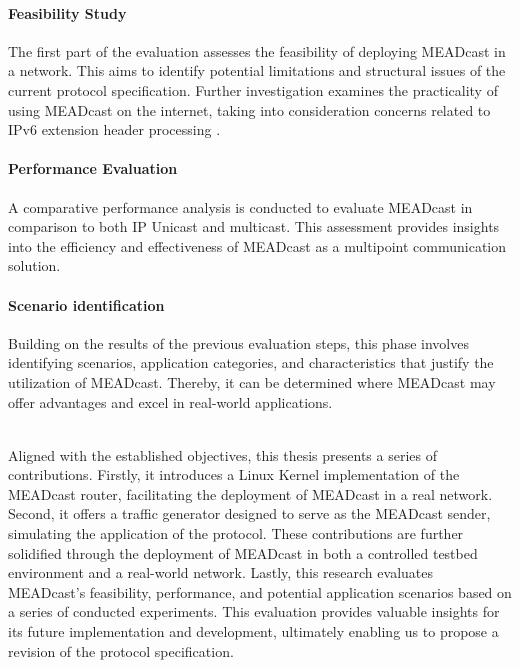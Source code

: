 \paragraph{Feasibility Study} %
\label{par:Feasibility Study}
The first part of the evaluation assesses the feasibility of deploying
    MEADcast in a network.
This aims to identify potential limitations and structural issues of the
    current protocol specification.
Further investigation examines the practicality of using MEADcast on the
    internet, taking into consideration concerns related to IPv6 extension
    header processing \cite{rfc7872_ext_hdrs_drop_rate}.

\paragraph{Performance Evaluation} %
\label{par:Performance Evaluation}
A comparative performance analysis is conducted to evaluate MEADcast in
    comparison to both IP Unicast and multicast.
This assessment provides insights into the efficiency and effectiveness of
    MEADcast as a multipoint communication solution.

\paragraph{Scenario identification} %
\label{par:Scenario identification}
Building on the results of the previous evaluation steps, this phase involves
    identifying scenarios, application categories, and characteristics that
    justify the utilization of MEADcast.
Thereby, it can be determined where MEADcast may offer advantages and excel in
    real-world applications.
    
\noindent\\
Aligned with the established objectives, this thesis presents a series of
    contributions.
Firstly, it introduces a Linux Kernel implementation of the MEADcast router,
    facilitating the deployment of MEADcast in a real network.
Second, it offers a traffic generator designed to serve as the MEADcast sender,
    simulating the application of the protocol.
These contributions are further solidified through the deployment of MEADcast
    in both a controlled testbed environment and a real-world network.
Lastly, this research evaluates MEADcast's feasibility, performance, and
    potential application scenarios based on a series of conducted experiments.
This evaluation provides valuable insights for its future implementation and
    development, ultimately enabling us to propose a revision of the protocol
    specification.

